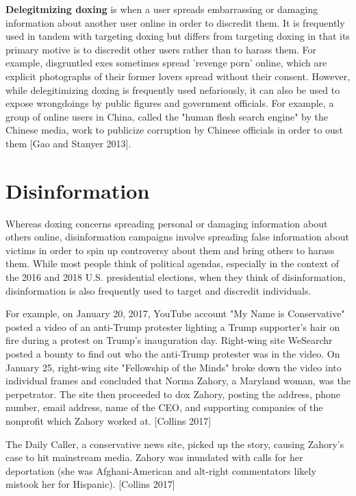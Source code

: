 \documentclass[class=book, crop=false]{standalone}
\providecommand{\keyterm}[1]{\textbf{#1}\marginnote{\scriptsize \textbf{#1}}}
\begin{document}
\keyterm{Delegitmizing doxing} is when a user spreads embarrassing or damaging information about another user online in order to discredit them. It is frequently used in tandem with targeting doxing but differs from targeting doxing in that its primary motive is to discredit other users rather than to harass them. For example, disgruntled exes sometimes spread 'revenge porn' online, which are explicit photographs of their former lovers spread without their consent. However, while delegitimizing doxing is frequently used nefariously, it can also be used to expose wrongdoings by public figures and government officials. For example, a group of online users in China, called the "human flesh search engine" by the Chinese media, work to publicize corruption by Chinese officials in order to oust them [Gao and Stanyer 2013].

\section{Disinformation}

Whereas doxing concerns spreading personal or damaging information about others online, disinformation campaigns involve spreading false information about victims in order to spin up controversy about them and bring others to harass them. While most people think of political agendas, especially in the context of the 2016 and 2018 U.S. presidential elections, when they think of disinformation, disinformation is also frequently used to target and discredit individuals.

For example, on January 20, 2017, YouTube account "My Name is Conservative" posted a video of an anti-Trump protester lighting a Trump supporter's hair on fire during a protest on Trump's inauguration day. Right-wing site WeSearchr posted a bounty to find out who the anti-Trump protester was in the video. On January 25, right-wing site "Fellowship of the Minds" broke down the video into individual frames and concluded that Norma Zahory, a Maryland woman, was the perpetrator. The site then proceeded to dox Zahory, posting the address, phone number, email address, name of the CEO, and supporting companies of the nonprofit which Zahory worked at. [Collins 2017]

The Daily Caller, a conservative news site, picked up the story, causing Zahory's case to hit mainstream media. Zahory was inundated with calls for her deportation (she was Afghani-American and alt-right commentators likely mistook her for Hispanic). [Collins 2017]
\end{document}
